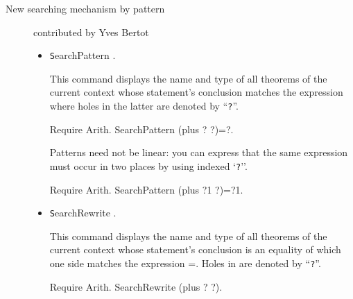 \documentclass[11pt]{article}
\begin{document}
\begin{description}
    
\item[New searching mechanism by pattern] contributed by Yves Bertot

\begin{itemize}

\item {\texttt SearchPattern {\term}.}

This command displays the name and type of all theorems of the current
context whose statement's conclusion matches the expression {\term}
where holes in the latter are denoted by ``{\texttt ?}''.

\begin{coq_example}
Require Arith.
SearchPattern (plus ? ?)=?.
\end{coq_example}

Patterns need not be linear: you can express that the same
expression must occur in two places by using indexed `{\texttt ?}''.

\begin{coq_example}
Require Arith.
SearchPattern (plus ?1 ?)=?1.
\end{coq_example}

\item {\texttt SearchRewrite {\term}.}

This command displays the name and type of all theorems of the current
context whose statement's conclusion is an equality of which one side matches
the expression {\term =}. Holes in {\term} are denoted by ``{\texttt ?}''.

\begin{coq_example}
Require Arith.
SearchRewrite (plus ? ?).
\end{coq_example}
\end{itemize}

\end{description}
\end{document}
